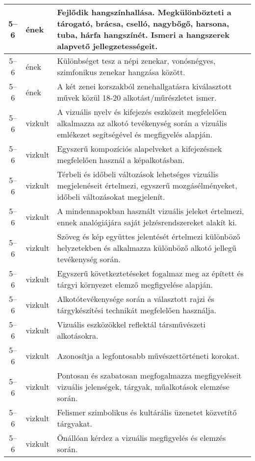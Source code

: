 \begin{small}
\begin{longtable}{c | p{2cm} |  p{11cm} }
              5--6 & ének & Fejlődik hangszínhallása. Megkülönbözteti a tárogató, brácsa, cselló, nagybőgő, harsona, tuba, hárfa hangszínét. Ismeri a hangszerek alapvető jellegzetességeit. \\ \hline
              5--6 & ének & Különbséget tesz a népi zenekar, vonósnégyes, szimfonikus zenekar hangzása között. \\ \hline
              5--6 & ének & A két zenei korszakból zenehallgatásra kiválasztott művek közül 18-20 alkotást/műrészletet ismer. \\ \hline
              5--6 & vizkult & A vizuális nyelv és kifejezés eszközeit megfelelően alkalmazza az alkotó tevékenység során a vizuális emlékezet segítségével és megfigyelés alapján. \\ \hline
              5--6 & vizkult & Egyszerű kompozíciós alapelveket a kifejezésnek megfelelően használ a képalkotásban. \\ \hline
              5--6 & vizkult & Térbeli és időbeli változások lehetséges vizuális megjelenéseit értelmezi, egyszerű mozgásélményeket, időbeli változásokat megjelenít. \\ \hline
              5--6 & vizkult & A mindennapokban használt vizuális jeleket értelmezi, ennek analógiájára saját jelzésrendszereket alakít ki. \\ \hline
              5--6 & vizkult & Szöveg és kép együttes jelentését értelmezi különböző helyzetekben és alkalmazza különböző alkotó jellegű tevékenység során. \\ \hline
              5--6 & vizkult & Egyszerű következtetéseket fogalmaz meg az épített és tárgyi környezet elemző megfigyelése alapján. \\ \hline
              5--6 & vizkult & Alkotótevékenysége során a választott rajzi és tárgykészítési technikát megfelelően használja. \\ \hline
              5--6 & vizkult & Vizuális eszközökkel reflektál társművészeti alkotásokra. \\ \hline
              5--6 & vizkult & Azonosítja a legfontosabb művészettörténeti korokat. \\ \hline
              5--6 & vizkult & Pontosan és szabatosan megfogalmazza megfigyeléseit vizuális jelenségek, tárgyak, műalkotások elemzése során. \\ \hline
              5--6 & vizkult & Felismer szimbolikus és kultárális üzenetet közvetítő tárgyakat. \\ \hline
              5--6 & vizkult & Önállóan kérdez a vizuális megfigyelés és elemzés során. \\ \hline

\end{longtable}
\end{small}
